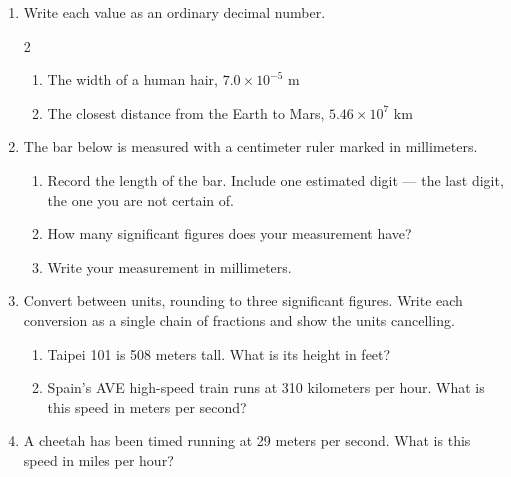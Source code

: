 \documentclass[12pt, twoside]{article}
\begin{document}
\begin{enumerate}[itemsep=0.8cm]
\item Write each value as an ordinary decimal number.
  \begin{multicols}{2}
    \raggedright
    \begin{enumerate}
      \item The width of a human hair, $7.0 \times 10^{-5}$ m
      \item The closest distance from the Earth to Mars, $5.46 \times 10^{7}$ km
    \end{enumerate}
  \end{multicols}

\newpage

\item The bar below is measured with a centimeter ruler marked in millimeters.

\begin{center}
\end{center}

  \begin{enumerate}[itemsep=1.0cm]
    \item Record the length of the bar. Include one estimated digit --- the last
      digit, the one you are not certain of.
    \item How many significant figures does your measurement have?
    \item Write your measurement in millimeters.
  \end{enumerate} \vspace{1.0cm}

\item Convert between units, rounding to three significant figures. Write each
  conversion as a single chain of fractions and show the units cancelling.
  \begin{enumerate}[itemsep=2.6cm]
    \item Taipei 101 is 508 meters tall. What is its height in feet?
    \item Spain's AVE high-speed train runs at 310 kilometers per hour. What is this
      speed in meters per second?
  \end{enumerate} \vspace{2.4cm}

\item A cheetah has been timed running at 29 meters per second. What is this speed
  in miles per hour?

\end{enumerate}
\end{document}
